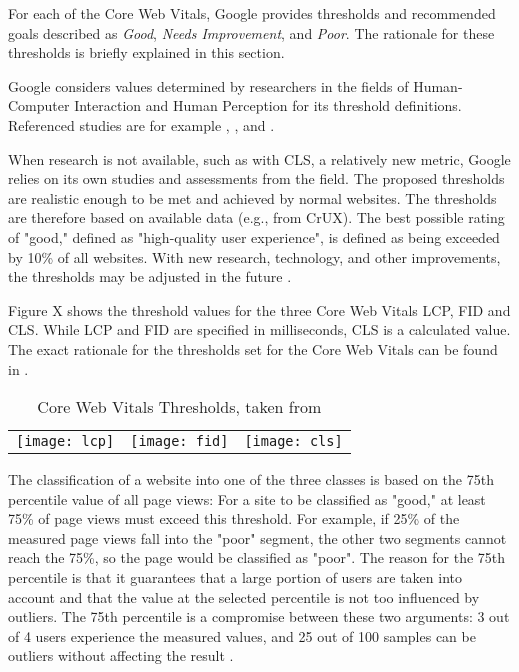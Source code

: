 For each of the Core Web Vitals, Google provides thresholds and recommended goals described as \textit{Good}, \textit{Needs Improvement}, and \textit{Poor}.
The rationale for these thresholds is briefly explained in this section.

Google considers values determined by researchers in the fields of Human-Computer Interaction and Human Perception for its threshold definitions.
Referenced studies are for example \cite{2004Galletta}, \cite{2000Hoxmeier}, and \cite{2005Oulasvirta}.

When research is not available, such as with CLS, a relatively new metric, Google relies on its own studies and assessments from the field.
The proposed thresholds are realistic enough to be met and achieved by normal websites.
The thresholds are therefore based on available data (e.g., from CrUX).
The best possible rating of "good," defined as "high-quality user experience", is defined as being exceeded by 10\% of all websites.
With new research, technology, and other improvements, the thresholds may be adjusted in the future \cite{2020McQuade}.

Figure X shows the threshold values for the three Core Web Vitals LCP, FID and CLS.
While LCP and FID are specified in milliseconds, CLS is a calculated value.
The exact rationale for the thresholds set for the Core Web Vitals can be found in \cite{2020McQuade}.

\begin{table}[h]
	\centering
	\begin{tabular}{ c c c }
	\texttt{[image: lcp]} &
	\texttt{[image: fid]} &
	\texttt{[image: cls]} \\
	\end{tabular}
	\medskip
	\caption[Core Web Vitals Thresholds]{Core Web Vitals Thresholds, taken from \cite{2020McQuade}}
	\label{table:vitals_thresholds}
\end{table}



The classification of a website into one of the three classes is based on the 75th percentile value of all page views:
For a site to be classified as "good," at least 75\% of page views must exceed this threshold.
For example, if 25\% of the measured page views fall into the "poor" segment, the other two segments cannot reach the 75\%, so the page would be classified as "poor".
The reason for the 75th percentile is that it guarantees that a large portion of users are taken into account and that the value at the selected percentile is not too influenced by outliers.
The 75th percentile is a compromise between these two arguments: 3 out of 4 users experience the measured values, and 25 out of 100 samples can be outliers without affecting the result \cite{2020McQuade}.


